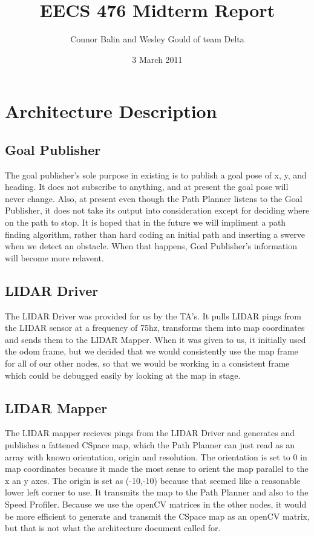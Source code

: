 \documentclass{article}
\author{Connor Balin and Wesley Gould of team Delta}
\title{EECS 476 Midterm Report}
\date{3 March 2011}
\begin{document}
\maketitle

\section{Architecture Description}

\subsection{Goal Publisher}

The goal publisher's sole purpose in existing is to publish a goal pose of x, y, and heading.   It does not subscribe to anything, and at present the goal pose will never change.  Also, at present even though the Path Planner listens to the Goal Publisher, it does not take its output into consideration except for deciding where on the path to stop.  It is hoped that in the future we will impliment a path finding algorithm, rather than hard coding an initial path and inserting a swerve when we detect an obstacle.  When that happens, Goal Publisher's information will become more relavent.

\subsection{LIDAR Driver}

The LIDAR Driver was provided for us by the TA's.  It pulls LIDAR pings from the LIDAR sensor at a frequency of 75hz, transforms them into map coordinates and sends them to the LIDAR Mapper.  When it was given to us, it initially used the odom frame, but we decided that we would consistently use the map frame for all of our other nodes, so that we would be working in a consistent frame which could be debugged easily by looking at the map in stage.

\subsection{LIDAR Mapper}

The LIDAR mapper recieves pings from the LIDAR Driver and generates and publishes a fattened CSpace map, which the Path Planner can just read as an array with known orientation, origin and resolution.  The orientation is set to 0 in map coordinates because it made the most sense to orient the map parallel to the x an y axes.  The origin is set as (-10,-10) because that seemed like a reasonable lower left corner to use.  It transmits the map to the Path Planner and also to the Speed Profiler.  Because we use the openCV matrices in the other nodes, it would be more efficient to generate and transmit the CSpace map as an openCV matrix, but that is not what the architecture document called for.
\end{document}
